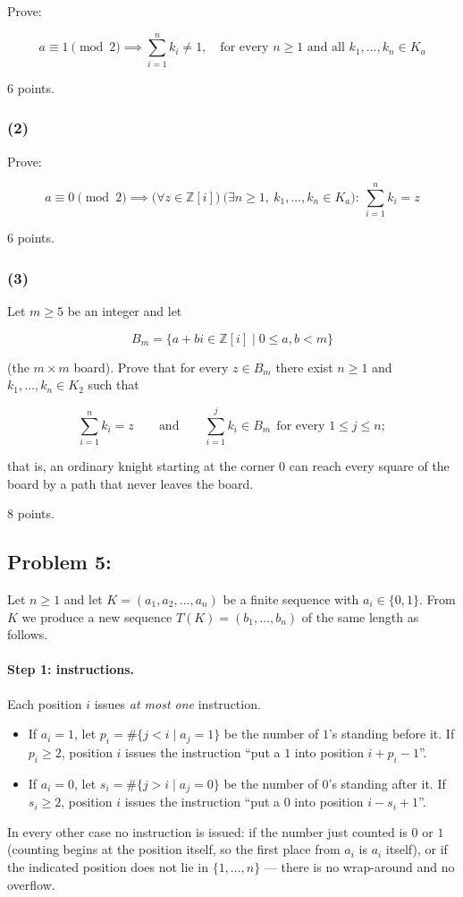 \documentclass{article}
\begin{document}
Prove:

$$a \equiv 1 \pmod{2}\implies\sum_{i=1}^n k_i\neq 1,
\quad\text{for every } n\ge 1 \text{ and all } k_1,\ldots,k_n\in K_a$$

6 points.

\subsubsection{(2)}

Prove:

$$a \equiv 0 \pmod{2}\implies
\bigl(\forall z\in\mathbb{Z}[i]\bigr)\ \bigl(\exists n\ge 1,\ 
k_1,\ldots,k_n\in K_a\bigr):\ \sum_{i=1}^n k_i=z$$

6 points.

\subsubsection{(3)}

Let $m\ge 5$ be an integer and let

$$B_m=\{a+bi\in\mathbb{Z}[i]\mid 0\le a,b<m\}$$

(the $m\times m$ board). Prove that for every $z\in B_m$ there exist
$n\ge 1$ and $k_1,\ldots,k_n\in K_2$ such that

$$\sum_{i=1}^n k_i=z\qquad\text{and}\qquad
\sum_{i=1}^j k_i\in B_m\ \ \text{for every } 1\le j\le n ;$$

that is, an ordinary knight starting at the corner $0$ can reach every
square of the board by a path that never leaves the board.

8 points.

\subsection{Problem 5:}

Let $n\ge 1$ and let $K=(a_1,a_2,\ldots ,a_n)$ be a finite sequence with
$a_i\in\{0,1\}$. From $K$ we produce a new sequence
$T(K)=(b_1,\ldots ,b_n)$ of the same length as follows.

\paragraph{Step 1: instructions.}
Each position $i$ issues \emph{at most one} instruction.
\begin{itemize}
\item If $a_i=1$, let $p_i=\#\{j<i\mid a_j=1\}$ be the number of $1$'s
standing before it. If $p_i\ge 2$, position $i$ issues the instruction
``put a $1$ into position $i+p_i-1$''.
\item If $a_i=0$, let $s_i=\#\{j>i\mid a_j=0\}$ be the number of $0$'s
standing after it. If $s_i\ge 2$, position $i$ issues the instruction
``put a $0$ into position $i-s_i+1$''.
\end{itemize}
In every other case no instruction is issued: if the number just counted is
$0$ or $1$ (counting begins at the position itself, so the first place from
$a_i$ is $a_i$ itself), or if the indicated position does not lie in
$\{1,\ldots ,n\}$ --- there is no wrap-around and no overflow.
\end{document}
